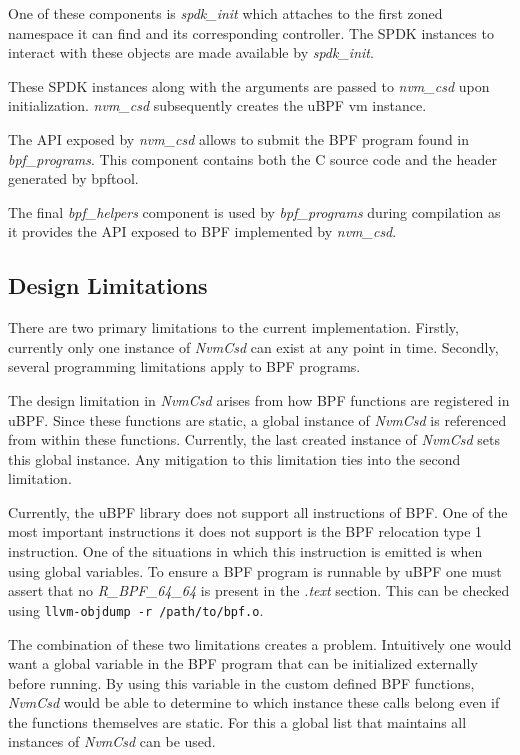 \documentclass[conference]{IEEEtran}
\newcommand\bashstyle{
	\lstset{
		language=Bash,
		basicstyle=\ttm,
		showstringspaces=false,
		tabsize=2,
		aboveskip=0.2cm,
		belowskip=0.2cm,
		prebreak=\textbackslash,
		extendedchars=true,
		mathescape=false,
		linewidth=8.85cm,
		breaklines=true
	}
}
\newcommand\bashinline[1]{{\bashstyle\lstinline!#1!}}
\begin{document}
One of these components is \textit{spdk\_init} which attaches to the first zoned
namespace it can find and its corresponding controller. The SPDK instances to
interact with these objects are made available by \textit{spdk\_init}.

These SPDK instances along with the arguments are passed to \textit{nvm\_csd}
upon initialization. \textit{nvm\_csd} subsequently creates the uBPF vm
instance.

The API exposed by \textit{nvm\_csd} allows to submit the BPF program found in
\textit{bpf\_programs}. This component contains both the C source code and the
header generated by bpftool.

The final \textit{bpf\_helpers} component is used by \textit{bpf\_programs}
during compilation as it provides the API exposed to BPF implemented by
\textit{nvm\_csd}.

\subsection{Design Limitations}

There are two primary limitations to the current implementation. Firstly,
currently only one instance of \textit{NvmCsd} can exist at any point in time.
Secondly, several programming limitations apply to BPF programs.

The design limitation in \textit{NvmCsd} arises from how BPF functions are
registered in uBPF. Since these functions are static, a global instance of
\textit{NvmCsd} is referenced from within these functions. Currently, the last
created instance of \textit{NvmCsd} sets this global instance. Any mitigation
to this limitation ties into the second limitation.

Currently, the uBPF library does not support all instructions of BPF. One of the
most important instructions it does not support is the BPF relocation type 1
instruction. One of the situations in which this instruction is emitted is when
using global variables. To ensure a BPF program is runnable by uBPF one
must assert that no \textit{R\_BPF\_64\_64} is present in the \textit{.text}
section. This can be checked using\bashinline{llvm-objdump -r /path/to/bpf.o}.

The combination of these two limitations creates a problem. Intuitively one
would want a global variable in the BPF program that can be initialized
externally before running. By using this variable in the custom defined BPF
functions, \textit{NvmCsd} would be able to determine to which instance these
calls belong even if the functions themselves are static. For this a global
list that maintains all instances of \textit{NvmCsd} can be used.
\end{document}
